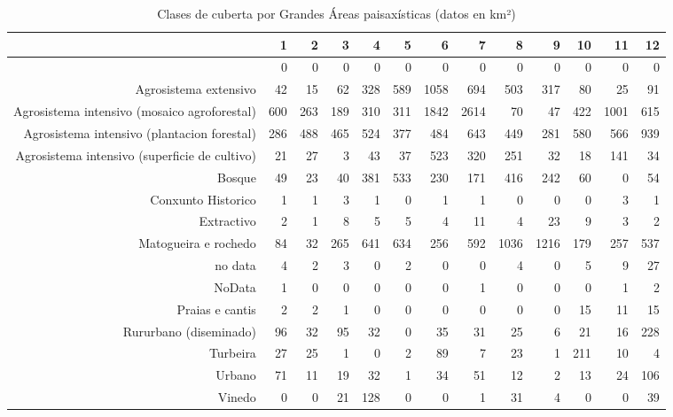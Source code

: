 \begin{table}[p]
\centering
\caption{Clases de cuberta por Grandes Áreas paisaxísticas (datos en km²)} 
\label{xtaboa2}
\begin{tabular}{rrrrrrrrrrrrr}
  \hline
 & 1 & 2 & 3 & 4 & 5 & 6 & 7 & 8 & 9 & 10 & 11 & 12 \\ 
  \hline
 & 0 & 0 & 0 & 0 & 0 & 0 & 0 & 0 & 0 & 0 & 0 & 0 \\ 
  Agrosistema extensivo & 42 & 15 & 62 & 328 & 589 & 1058 & 694 & 503 & 317 & 80 & 25 & 91 \\ 
  Agrosistema intensivo (mosaico agroforestal) & 600 & 263 & 189 & 310 & 311 & 1842 & 2614 & 70 & 47 & 422 & 1001 & 615 \\ 
  Agrosistema intensivo (plantacion forestal) & 286 & 488 & 465 & 524 & 377 & 484 & 643 & 449 & 281 & 580 & 566 & 939 \\ 
  Agrosistema intensivo (superficie de cultivo) & 21 & 27 & 3 & 43 & 37 & 523 & 320 & 251 & 32 & 18 & 141 & 34 \\ 
  Bosque & 49 & 23 & 40 & 381 & 533 & 230 & 171 & 416 & 242 & 60 & 0 & 54 \\ 
  Conxunto Historico & 1 & 1 & 3 & 1 & 0 & 1 & 1 & 0 & 0 & 0 & 3 & 1 \\ 
  Extractivo & 2 & 1 & 8 & 5 & 5 & 4 & 11 & 4 & 23 & 9 & 3 & 2 \\ 
  Matogueira e rochedo & 84 & 32 & 265 & 641 & 634 & 256 & 592 & 1036 & 1216 & 179 & 257 & 537 \\ 
  no data & 4 & 2 & 3 & 0 & 2 & 0 & 0 & 4 & 0 & 5 & 9 & 27 \\ 
  NoData & 1 & 0 & 0 & 0 & 0 & 0 & 1 & 0 & 0 & 0 & 1 & 2 \\ 
  Praias e cantis & 2 & 2 & 1 & 0 & 0 & 0 & 0 & 0 & 0 & 15 & 11 & 15 \\ 
  Rururbano (diseminado) & 96 & 32 & 95 & 32 & 0 & 35 & 31 & 25 & 6 & 21 & 16 & 228 \\ 
  Turbeira & 27 & 25 & 1 & 0 & 2 & 89 & 7 & 23 & 1 & 211 & 10 & 4 \\ 
  Urbano & 71 & 11 & 19 & 32 & 1 & 34 & 51 & 12 & 2 & 13 & 24 & 106 \\ 
  Vinedo & 0 & 0 & 21 & 128 & 0 & 0 & 1 & 31 & 4 & 0 & 0 & 39 \\ 
   \hline
\end{tabular}
\end{table}
